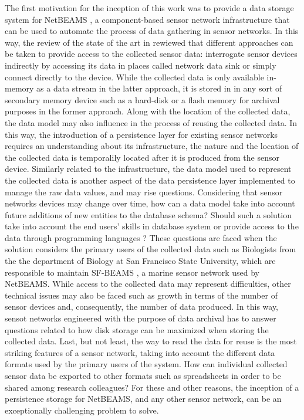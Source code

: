 The first motivation for the inception of this work was to provide a data
storage system for NetBEAMS \cite{netbeams2009}, a component-based sensor
network infrastructure that can be used to automate the process of data
gathering in sensor networks. In this way, the review of the state of the
art in rewiewed that different approaches can be taken to provide access to the
collected sensor data: interrogate sensor devices indirectly by accessing its
data in places called network data sink or simply connect directly to the
device. While the collected data is only available in-memory as a data stream
in the latter approach, it is stored in in any sort of secondary memory
device such as a hard-disk or a flash memory for archival purposes in the
former approach. Along with the location of the collected data, the data model 
may also influence in the process of reusing the collected data. In this way,
the introduction of a persistence layer for existing sensor networks requires
an understanding about its infrastructure, the nature and the location of the
collected data is temporalily located after it is produced from the sensor
device. Similarly related to the infrastructure, the data model used to
represent the collected data is another aspect of the data persistence layer
implemented to manage the raw data values, and may rise questions. Considering
that sensor networks devices may change over time, how can a data model take
into account future additions of new entities to the database schema? Should 
such a solution take into account the end users' skills in database system or
provide access to the data through programming languages
\cite{sn-programming-language}? These questions are faced when the solution
considers the primary users of the collected data such as Biologists from the
the department of Biology at San Francisco State University, which are
responsible to maintain SF-BEAMS \cite{sfbeams2006}, a marine sensor network
used by NetBEAMS. While access to the collected data may represent
difficulties, other technical issues may also be faced such as growth in terms
of the number of sensor devices and, consequently, the number of data
produced. In this way, sensot networks engineered with the purpose of data
archival has to answer questions related to how disk storage can be maximized
when storing the collected data. Last, but not least, the way to read the data
for reuse is the most striking features of a sensor network, taking into
account the different data formats used by the primary users of the system.
How can individual collected sensor data be exported to other formats such as
spreadsheets in order to be shared among research colleagues? For these and
other reasons, the inception of a persistence storage for NetBEAMS, and any
other sensor network, can be an exceptionally challenging problem to solve.

